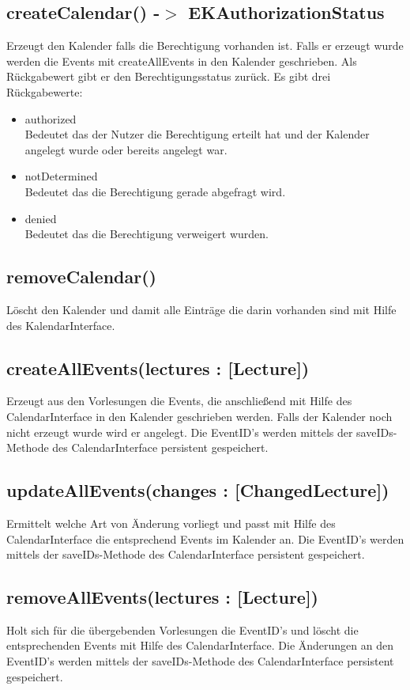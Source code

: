 \subsection{createCalendar() -$>$ EKAuthorizationStatus}
Erzeugt den Kalender falls die Berechtigung vorhanden ist. Falls er erzeugt wurde werden die Events mit createAllEvents in den Kalender geschrieben. Als Rückgabewert gibt er den Berechtigungsstatus zurück. Es gibt drei Rückgabewerte:
\begin{itemize}
     \item authorized \\[0.5em]
     Bedeutet das der Nutzer die Berechtigung erteilt hat und der Kalender angelegt wurde oder bereits angelegt war.
     \item notDetermined \\[0.5em]
     Bedeutet das die Berechtigung gerade abgefragt wird.
     \item denied \\[0.5em]
     Bedeutet das die Berechtigung verweigert wurden.
\end{itemize}

\subsection{removeCalendar()}
Löscht den Kalender und damit alle Einträge die darin vorhanden sind mit Hilfe des KalendarInterface.

\subsection{createAllEvents(lectures : [Lecture])}
Erzeugt aus den Vorlesungen die Events, die anschließend mit Hilfe des CalendarInterface in den Kalender geschrieben werden.
Falls der Kalender noch nicht erzeugt wurde wird er angelegt.
Die EventID's werden mittels der saveIDs-Methode des CalendarInterface persistent gespeichert.

\subsection{updateAllEvents(changes : [ChangedLecture])}
Ermittelt welche Art von Änderung vorliegt und passt mit Hilfe des CalendarInterface die  entsprechend Events im Kalender an.
Die EventID's werden mittels der saveIDs-Methode des CalendarInterface persistent gespeichert.

\subsection{removeAllEvents(lectures : [Lecture])}
Holt sich für die übergebenden Vorlesungen die EventID's und löscht die entsprechenden Events mit Hilfe des CalendarInterface.
Die Änderungen an den EventID's werden mittels der saveIDs-Methode des CalendarInterface persistent gespeichert.

